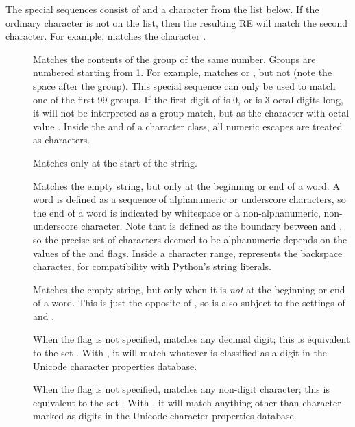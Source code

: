 The special sequences consist of \character{\e} and a character from the
list below.  If the ordinary character is not on the list, then the
resulting RE will match the second character.  For example,
\regexp{\e\$} matches the character \character{\$}.
%
\begin{description}

\item[] Matches the contents of the group of the
same number.  Groups are numbered starting from 1.  For example,
 matches  or , but not
 (note
the space after the group).  This special sequence can only be used to
match one of the first 99 groups.  If the first digit of 
is 0, or  is 3 octal digits long, it will not be interpreted
as a group match, but as the character with octal value .
Inside the \character{[} and \character{]} of a character class, all numeric
escapes are treated as characters.

\item[] Matches only at the start of the string.

\item[] Matches the empty string, but only at the
beginning or end of a word.  A word is defined as a sequence of
alphanumeric or underscore characters, so the end of a word is indicated by
whitespace or a non-alphanumeric, non-underscore character.  Note that 
{} is defined as the boundary between  and , so the precise set of characters deemed to be alphanumeric depends on the
values of the  and  flags.  Inside a character
range,  represents the backspace character, for compatibility
with Python's string literals.

\item[] Matches the empty string, but only when it is \emph{not}
at the beginning or end of a word.  This is just the opposite of {}, so is also subject to the settings of  and .

\item[]When the  flag is not specified, matches
any decimal digit; this is equivalent to the set \regexp{[0-9]}. 
With , it will match whatever is classified as a digit
in the Unicode character properties database.

\item[]When the  flag is not specified, matches
any non-digit character; this is equivalent to the set 
\regexp{[{\textasciicircum}0-9]}.  With , it will match 
anything other than character marked as digits in the Unicode character 
properties database.


\end{description}
